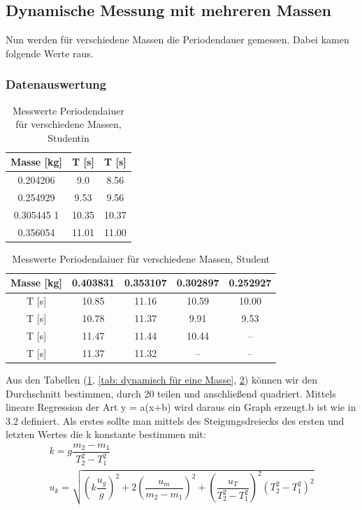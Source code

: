 \documentclass[bibliography=totocnumbered]{scrartcl}
\begin{document}
	\subsection{Dynamische Messung mit mehreren Massen}
	Nun werden für verschiedene Massen die Periodendauer gemessen. Dabei kamen folgende Werte
	raus.
	\subsubsection{Datenauswertung}
	\begin{table}[ht!]
		\centering
		\caption{Messwerte Periodendaiuer für verschiedene Massen, Studentin}
		\begin{tabular}{|c|c|c|}
			\hline
			Masse [kg] & T [s] & T [s]\\
			\hline
			0.204206 & 9.0 & 8.56 \\
			\hline
			0.254929 & 9.53 & 9.56 \\
			\hline
			0.305445 1 & 10.35 & 10.37 \\
			\hline
			0.356054 & 11.01 &  11.00\\
			\hline
		\end{tabular}
		\label{tab: Sara dyn. Messung, meherer Massen}
	\end{table}
	
	\begin{table}[ht!]
		\centering
		\caption{Messwerte Periodendaiuer für verschiedene Massen, Student}
		\begin{tabular}{|c|c|c|c|c|}
			\hline
			Masse [kg] & 0.403831 & 0.353107 & 0.302897 & 0.252927 \\
			\hline
			T [s] & 10.85 &11.16   & 10.59 & 10.00 \\
			\hline
			T [s]& 10.78 & 11.37 & 9.91 &  9.53\\
			\hline
			T [s]& 11.47 & 11.44  &10.44  & -- \\
			\hline
			T [s]&11.37  & 11.32  & -- & -- \\
			\hline
		\end{tabular}
		\label{tab: Ben dyn. Messung, meherer Massen}
	\end{table}
	
	Aus den Tabellen (\ref{tab: Sara dyn. Messung, meherer Massen}, \ref{tab: dynamisch für eine Masse}, \ref{tab: Ben dyn. Messung, meherer Massen}) können wir den Durchschnitt bestimmen, durch 20 teilen und anschließend quadriert.
	Mittels lineare Regression der Art y = a(x+b) wird daraus ein Graph erzeugt.b ist wie in 3.2
	definiert.
	Als erstes sollte man mittels des Steigungsdreiecks des ersten und letzten Wertes die k konstante
	bestimmen mit:
	\begin{align}
		k=g\dfrac{m_{2}-m_{1}}{T_{2}^{2}-T_{1}^{2}}\\
		u_{k}=\sqrt{\left(k\dfrac{u_{g}}{g}\right)^{2}+2\left(\dfrac{u_{m}}{m_{2}-m_{1}}\right)^{2}+\left(\dfrac{u_{T}}{T_{2}^{2}-T_{1}^{2}}\right)^{2}(T_{2}^{2}-T_{1}^{2})^{2}}
	\end{align}
	
\end{document}
